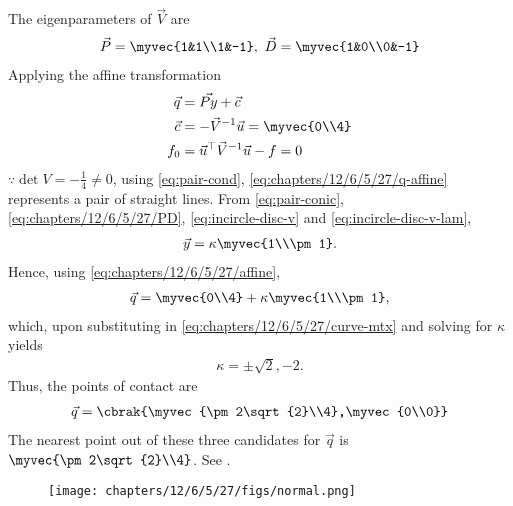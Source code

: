 The eigenparameters of $\vec{V}$ are
    \begin{align}
        \label{eq:chapters/12/6/5/27/PD}
        \vec{P} = \myvec{1&1\\1&-1},\ \vec{D} = \myvec{1&0\\0&-1}
    \end{align}
    Applying the affine transformation
    \begin{align}
        \label{eq:chapters/12/6/5/27/affine}
        \vec{q} &= \vec{Py} + \vec{c} \\
        \vec{c} &= -\vec{V}^{-1}\vec{u} 
 =\myvec{0\\4} \\
        f_0 &= \vec{u}^\top\vec{V}^{-1}\vec{u} - f 
            =  0
    \end{align}
$\because \det{V} = -\frac{1}{4} \neq 0$, 
	  using \eqref{eq:pair-cond},
        \eqref{eq:chapters/12/6/5/27/q-affine}
 represents a pair of straight lines.
      From \eqref{eq:pair-conic},
        \eqref{eq:chapters/12/6/5/27/PD},
	\eqref{eq:incircle-disc-v}
	and 
	\eqref{eq:incircle-disc-v-lam},
    \begin{align}
\vec{y} = \kappa\myvec{1\\\pm 1}.
        \label{eq:chapters/12/6/5/27/y-sol}
    \end{align}
    Hence, using 
        \eqref{eq:chapters/12/6/5/27/affine},
    \begin{align}
        \vec{q} 
                = \myvec{0\\4}+\kappa\myvec{1\\\pm 1},
        \label{eq:chapters/12/6/5/27/x-case}
    \end{align}
which, upon substituting in 
        \eqref{eq:chapters/12/6/5/27/curve-mtx}
	and solving for $\kappa$ yields
\begin{align}
	\kappa = \pm \sqrt{2}, -2.
\end{align}
 Thus, the points of contact are
    \begin{align}
        \vec{q}  = \cbrak{\myvec{\pm 2\sqrt{2}\\4},\myvec{0\\0}}
        \label{eq:chapters/12/6/5/27/poc-ans}
    \end{align}
    The nearest point out of these three candidates for $\vec{q}$ is
    $\myvec{\pm2\sqrt{2}\\4}$. 
See .
\begin{figure}[H]
        \centering
        \texttt{[image: chapters/12/6/5/27/figs/normal.png]}
        \caption{}
        \label{fig:chapters/12/6/5/27/normal}
    \end{figure}
